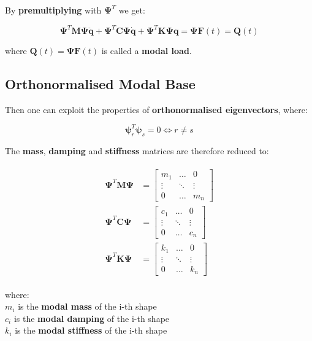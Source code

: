 \documentclass[10pt,b5paper,titlepage]{book}
\newenvironment{eqarray}
{
    \begin{eqnarray}
        \begin{aligned}
}
{
        \end{aligned}
    \end{eqnarray}
}
\begin{document}
By \textbf{premultiplying} with $ \mathbf{\Psi}^T $ we get:

\begin{equation}
    \mathbf{\Psi}^T \mathbf{M} \mathbf{\Psi} \ddot{\mathbf{q}} +
    \mathbf{\Psi}^T \mathbf{C} \mathbf{\Psi} \dot{\mathbf{q}} +
    \mathbf{\Psi}^T \mathbf{K} \mathbf{\Psi} \mathbf{q} =
    \mathbf{\Psi}\mathbf{F}(t) = \mathbf{Q}(t)
\end{equation}

where $ \mathbf{Q}(t) = \mathbf{\Psi} \mathbf{F}(t) $ is called a \textbf{modal load}.

\subsection{Orthonormalised Modal Base}

Then one can exploit the properties of \textbf{orthonormalised eigenvectors}, where:

\begin{equation}
    \mathbf{\psi}_r^T \mathbf{\psi}_s = 0 \Leftrightarrow r \neq s
\end{equation}

The \textbf{mass}, \textbf{damping} and \textbf{stiffness} matrices are therefore
reduced to:

\begin{eqarray}
    \mathbf{\Psi}^T \mathbf{M} \mathbf{\Psi}
    &= \begin{bmatrix}
        m_1 & \dots & 0 \\
        \vdots & \ddots & \vdots \\
        0 & \dots & m_n
    \end{bmatrix} \\
    \mathbf{\Psi}^T \mathbf{C} \mathbf{\Psi}
    &= \begin{bmatrix}
        c_1 & \dots & 0 \\
        \vdots & \ddots & \vdots \\
        0 & \dots & c_n
    \end{bmatrix} \\
    \mathbf{\Psi}^T \mathbf{K} \mathbf{\Psi}
    &= \begin{bmatrix}
        k_1 & \dots & 0 \\
        \vdots & \ddots & \vdots \\
        0 & \dots & k_n
    \end{bmatrix}
\end{eqarray}

where: \\
$ m_i $ is the \textbf{modal mass} of the i-th shape\\
$ c_i $ is the \textbf{modal damping} of the i-th shape\\
$ k_i $ is the \textbf{modal stiffness} of the i-th shape
\end{document}

